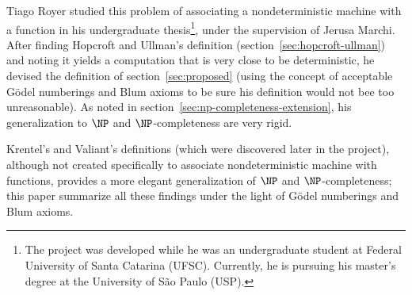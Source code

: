 \documentclass[12pt]{article}
\theoremstyle{definition}
\begin{document}
Tiago Royer studied this problem of associating a nondeterministic machine
with a function in his undergraduate thesis\footnote{
    The project was developed while he was an undergraduate student
    at Federal University of Santa Catarina (UFSC).
    Currently, he is pursuing his master's degree
    at the University of São Paulo (USP).
},
under the supervision of Jerusa Marchi.
After finding Hopcroft and Ullman's definition
(section~\ref{sec:hopcroft-ullman})
and noting it yields a computation that is very close to be deterministic,
he devised the definition of section~\ref{sec:proposed}
(using the concept of acceptable Gödel numberings and Blum axioms
to be sure his definition would not bee too unreasonable).
As noted in section~\ref{sec:np-completeness-extension},
his generalization to $\NP$ and $\NP$-completeness are very rigid.

Krentel's and Valiant's definitions
(which were discovered later in the project),
although not created specifically to associate nondeterministic machine with functions,
provides a more elegant generalization of $\NP$ and $\NP$-completeness;
this paper summarize all these findings
under the light of Gödel numberings and Blum axioms.



\end{document}
